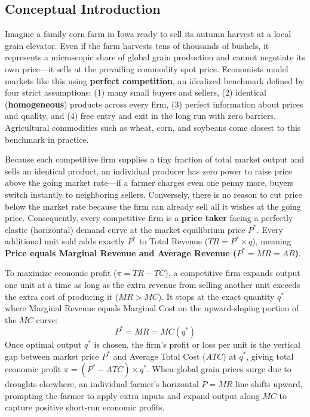 \documentclass[11pt,letterpaper]{article}
\begin{document}
\subsection*{Conceptual Introduction}
Imagine a family corn farm in Iowa ready to sell its autumn harvest at a local grain elevator. Even if the farm harvests tens of thousands of bushels, it represents a microscopic share of global grain production and cannot negotiate its own price—it sells at the prevailing commodity spot price. Economists model markets like this using \textbf{perfect competition}, an idealized benchmark defined by four strict assumptions: (1) many small buyers and sellers, (2) identical (\textbf{homogeneous}) products across every firm, (3) perfect information about prices and quality, and (4) free entry and exit in the long run with zero barriers. Agricultural commodities such as wheat, corn, and soybeans come closest to this benchmark in practice.

Because each competitive firm supplies a tiny fraction of total market output and sells an identical product, an individual producer has zero power to raise price above the going market rate—if a farmer charges even one penny more, buyers switch instantly to neighboring sellers. Conversely, there is no reason to cut price below the market rate because the firm can already sell all it wishes at the going price. Consequently, every competitive firm is a \textbf{price taker} facing a perfectly elastic (horizontal) demand curve at the market equilibrium price $P^*$. Every additional unit sold adds exactly $P^*$ to Total Revenue ($TR = P^* \times q$), meaning \textbf{Price equals Marginal Revenue and Average Revenue ($P^* = MR = AR$)}.

To maximize economic profit ($\pi = TR - TC$), a competitive firm expands output one unit at a time as long as the extra revenue from selling another unit exceeds the extra cost of producing it ($MR > MC$). It stops at the exact quantity $q^*$ where Marginal Revenue equals Marginal Cost on the upward-sloping portion of the $MC$ curve:
\begin{equation}
P^* = MR = MC(q^*)
\end{equation}
Once optimal output $q^*$ is chosen, the firm's profit or loss per unit is the vertical gap between market price $P^*$ and Average Total Cost ($ATC$) at $q^*$, giving total economic profit $\pi = (P^* - ATC) \times q^*$. When global grain prices surge due to droughts elsewhere, an individual farmer's horizontal $P = MR$ line shifts upward, prompting the farmer to apply extra inputs and expand output along $MC$ to capture positive short-run economic profits.
\end{document}
